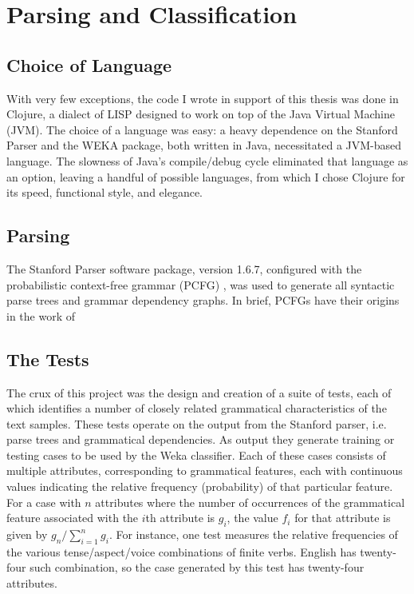 \documentclass[main.tex]{subfiles}
\begin{document}
\section{Parsing and Classification}

\subsection{Choice of Language}

With very few exceptions, the code I wrote in support of this thesis was done in Clojure, a dialect of LISP designed to work on top of the Java Virtual Machine (JVM). The choice of a language was easy: a heavy dependence on the Stanford Parser and the WEKA package, both written in Java, necessitated a JVM-based language. The slowness of Java's compile/debug cycle eliminated that language as an option, leaving a handful of possible languages, from which I chose Clojure for its speed, functional style, and elegance.

\subsection{Parsing}

The Stanford Parser software package, version 1.6.7, configured with the probabilistic context-free grammar (PCFG) \citep*{klein-manning-pcfg:2003}, was used to generate all syntactic parse trees and grammar dependency graphs. In brief, PCFGs have their origins in the work of 

\subsection{The Tests}
The crux of this project was the design and creation of a suite of tests, each of which identifies a number of closely related grammatical characteristics of the text samples. These tests operate on the output from the Stanford parser, i.e. parse trees and grammatical dependencies. As output they generate training or testing cases to be used by the Weka classifier. Each of these cases consists of multiple attributes, corresponding to grammatical features, each with continuous values indicating the relative frequency (probability) of that particular feature. For a case with $n$ attributes where the number of occurrences of the grammatical feature associated with the $i$th attribute is $g_i$, the value $f_i$ for that attribute is given by $g_n  / \displaystyle\sum\limits_{i=1}^n g_i$. For instance, one test measures the relative frequencies of the various tense/aspect/voice combinations of finite verbs. English has twenty-four such combination, so the case generated by this test has twenty-four attributes.
\end{document}
